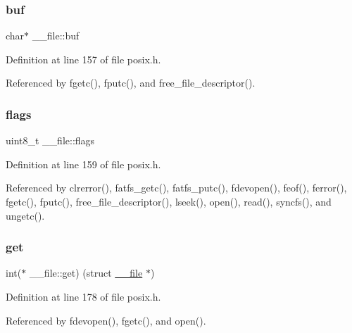 \subsubsection{\texorpdfstring{buf}{buf}}
{\footnotesize\ttfamily char$\ast$ \+\_\+\+\_\+file\+::buf}



Definition at line 157 of file posix.\+h.



Referenced by fgetc(), fputc(), and free\+\_\+file\+\_\+descriptor().

\mbox{\label{struct____file_a8d11df8679502efee09740f97d7c277b}} 
\subsubsection{\texorpdfstring{flags}{flags}}
{\footnotesize\ttfamily uint8\+\_\+t \+\_\+\+\_\+file\+::flags}



Definition at line 159 of file posix.\+h.



Referenced by clrerror(), fatfs\+\_\+getc(), fatfs\+\_\+putc(), fdevopen(), feof(), ferror(), fgetc(), fputc(), free\+\_\+file\+\_\+descriptor(), lseek(), open(), read(), syncfs(), and ungetc().

\mbox{\label{struct____file_a2d816b077c3af0425344fe4b283dad33}} 
\subsubsection{\texorpdfstring{get}{get}}
{\footnotesize\ttfamily int($\ast$ \+\_\+\+\_\+file\+::get) (struct \hyperlink{struct____file}{\+\_\+\+\_\+file} $\ast$)}



Definition at line 178 of file posix.\+h.



Referenced by fdevopen(), fgetc(), and open().

\mbox{\label{struct____file_a30309efd13a75ed510bb2370debafaf8}} 
